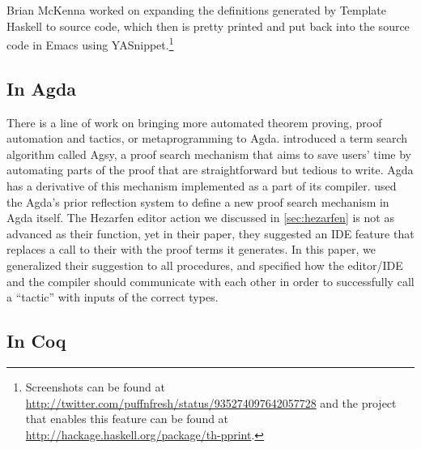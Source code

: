Brian McKenna worked on expanding the definitions generated by Template Haskell
to source code, which then is pretty printed and put back into the source code
in Emacs using YASnippet.\footnote{Screenshots can be found at
\url{http://twitter.com/puffnfresh/status/935274097642057728} and the project
that enables this feature can be found at
\url{http://hackage.haskell.org/package/th-pprint}.}


\subsection{In Agda}

There is a line of work on bringing more automated theorem proving,
proof automation and tactics, or metaprogramming to Agda.
\citet{agsy} introduced a term search algorithm called
Agsy, a proof search mechanism that aims to save users' time by automating
parts of the proof that are straightforward but tedious to write.
Agda has a derivative of this mechanism implemented as a part of its compiler.
\citet{autoinagda} used the Agda's prior reflection system to define a
new proof search mechanism in Agda itself.
The Hezarfen editor action we discussed in \autoref{sec:hezarfen} is not as advanced
as their  function, yet in their paper, they suggested an IDE feature
that replaces a call to their  with the proof terms it generates.
In this paper, we generalized their suggestion to all \Elab{} procedures, and specified
how the editor/IDE and the compiler should communicate with each other
in order to successfully call a ``tactic'' with inputs of the correct types.

\subsection{In Coq}

